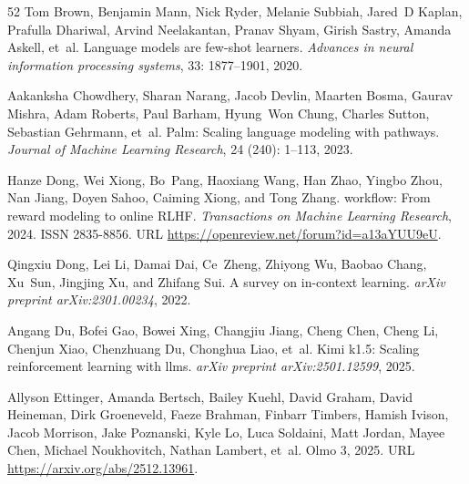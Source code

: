 \begin{thebibliography}{52}
Tom Brown, Benjamin Mann, Nick Ryder, Melanie Subbiah, Jared~D Kaplan, Prafulla Dhariwal, Arvind Neelakantan, Pranav Shyam, Girish Sastry, Amanda Askell, et~al.
\newblock Language models are few-shot learners.
\newblock \emph{Advances in neural information processing systems}, 33: 1877--1901, 2020.

Aakanksha Chowdhery, Sharan Narang, Jacob Devlin, Maarten Bosma, Gaurav Mishra, Adam Roberts, Paul Barham, Hyung~Won Chung, Charles Sutton, Sebastian Gehrmann, et~al.
\newblock Palm: Scaling language modeling with pathways.
\newblock \emph{Journal of Machine Learning Research}, 24 (240): 1--113, 2023.

Hanze Dong, Wei Xiong, Bo~Pang, Haoxiang Wang, Han Zhao, Yingbo Zhou, Nan Jiang, Doyen Sahoo, Caiming Xiong, and Tong Zhang.
 workflow: From reward modeling to online {RLHF}.
\newblock \emph{Transactions on Machine Learning Research}, 2024.
\newblock ISSN 2835-8856.
\newblock URL \url{https://openreview.net/forum?id=a13aYUU9eU}.

Qingxiu Dong, Lei Li, Damai Dai, Ce~Zheng, Zhiyong Wu, Baobao Chang, Xu~Sun, Jingjing Xu, and Zhifang Sui.
\newblock A survey on in-context learning.
\newblock \emph{arXiv preprint arXiv:2301.00234}, 2022.

Angang Du, Bofei Gao, Bowei Xing, Changjiu Jiang, Cheng Chen, Cheng Li, Chenjun Xiao, Chenzhuang Du, Chonghua Liao, et~al.
\newblock Kimi k1.5: Scaling reinforcement learning with llms.
\newblock \emph{arXiv preprint arXiv:2501.12599}, 2025.

Allyson Ettinger, Amanda Bertsch, Bailey Kuehl, David Graham, David Heineman, Dirk Groeneveld, Faeze Brahman, Finbarr Timbers, Hamish Ivison, Jacob Morrison, Jake Poznanski, Kyle Lo, Luca Soldaini, Matt Jordan, Mayee Chen, Michael Noukhovitch, Nathan Lambert, et~al.
\newblock Olmo 3, 2025.
\newblock URL \url{https://arxiv.org/abs/2512.13961}.


\end{thebibliography}
